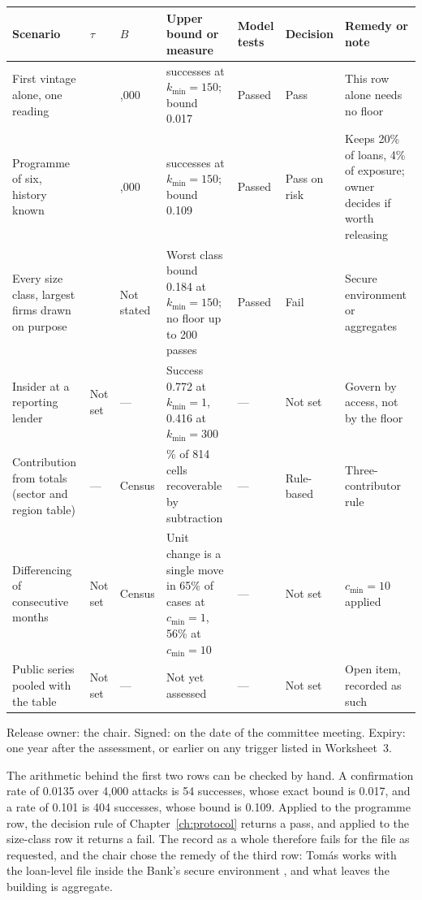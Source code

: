 \begin{example}
\begin{center}\footnotesize
\setlength{\tabcolsep}{3pt}
\begin{tabular}{@{}>{\raggedright\arraybackslash}p{2.5cm}>{\raggedright\arraybackslash}p{0.9cm}>{\raggedright\arraybackslash}p{1.0cm}>{\raggedright\arraybackslash}p{3.3cm}>{\raggedright\arraybackslash}p{1.2cm}>{\raggedright\arraybackslash}p{1.6cm}>{\raggedright\arraybackslash}p{2.3cm}@{}}
\toprule
Scenario & $\tau$ & $B$ & Upper bound or measure & Model tests & Decision & Remedy or note \\
\midrule
First vintage alone, one reading & 0.12 & 4,000 & 54 successes at $k_{\min} = 150$; bound 0.017 & Passed & Pass & This row alone needs no floor \\
Programme of six, history known & 0.12 & 4,000 & 404 successes at $k_{\min} = 150$; bound 0.109 & Passed & Pass on risk & Keeps 20\% of loans, 4\% of exposure; owner decides if worth releasing \\
Every size class, largest firms drawn on purpose & 0.12 & Not stated & Worst class bound 0.184 at $k_{\min} = 150$; no floor up to 200 passes & Passed & Fail & Secure environment or aggregates \\
Insider at a reporting lender & Not set & --- & Success 0.772 at $k_{\min} = 1$, 0.416 at $k_{\min} = 300$ & --- & Not set & Govern by access, not by the floor \\
Contribution from totals (sector and region table) & --- & Census & 5.9\% of 814 cells recoverable by subtraction & --- & Rule-based & Three-contributor rule \\
Differencing of consecutive months & Not set & Census & Unit change is a single move in 65\% of cases at $c_{\min} = 1$, 56\% at $c_{\min} = 10$ & --- & Not set & $c_{\min} = 10$ applied \\
Public series pooled with the table & Not set & --- & Not yet assessed & --- & Not set & Open item, recorded as such \\
\bottomrule
\end{tabular}
\end{center}

\noindent Release owner: the chair. Signed: on the date of the committee meeting. Expiry:
one year after the assessment, or earlier on any trigger listed in Worksheet~3.

The arithmetic behind the first two rows can be checked by hand. A confirmation rate of
0.0135 over 4,000 attacks is 54 successes, whose exact bound is 0.017, and a rate of
0.101 is 404 successes, whose bound is 0.109. Applied to the programme row, the decision
rule of Chapter~\ref{ch:protocol} returns a pass, and applied to the size-class row it
returns a fail. The record as a whole therefore fails for the file as requested, and the
chair chose the remedy of the third row: Tom\'as works with the loan-level file inside
the Bank's secure environment \citep{desai2016}, and what leaves the building is
aggregate.
\end{example}

